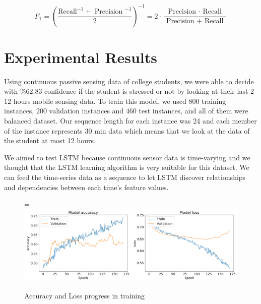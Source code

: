 \documentclass[12pt,oneandhalf,chaparabic,lfm,phd,eng,oneside,pntc]{gsufbe}
\makeatletter
\let\old@includegraphics\includegraphics
\renewcommand{\includegraphics}[2][,]{%
  \setbox9=\hbox{\old@includegraphics[#1]{#2}}%
  \ifdim\wd9>\textwidth
    \old@includegraphics[#1,width=\textwidth]{#2}%
  \else
    \old@includegraphics[#1]{#2}%
  \fi%
}
\makeatother
\begin{document}
\begin{equation}
F_{1}=\left(\frac{\mathrm{Recall}^{-1}+\text { Precision }^{-1}}{2}\right)^{-1}=2 \cdot \frac{\text { Precision } \cdot \text { Recall }}{\text { Precision }+\text { Recall }}
\end{equation}


\chapter{Experimental Results}
\label{chap:Experimental Results}
Using continuous passive sensing data of college students, we were able to decide with \%62.83 confidence if the student is stressed or not by looking at their last 2-12 hours mobile sensing data. To train this model, we used 800 training instances, 200 validation instances and 460 test instances, and all of them were balanced dataset. Our sequence length for each instance was 24 and each member of the instance represents 30 min data which means that we look at the data of the student at most 12 hours. 

We aimed to test LSTM because continuous sensor data is time-varying and we thought that the LSTM learning algorithm is very suitable for this dataset. We can feed the time-series data as a sequence to let LSTM discover relationships and dependencies between each time's feature values.

\begin{figure}[t]\vspace*{4pt}
\centerline{\includegraphics[width=160mm]{graphics/loss_acc.jpg}}
\caption{Accuracy and Loss progress in training}
\label{fig:Accuracy and Loss}
\end{figure}
\end{document}

